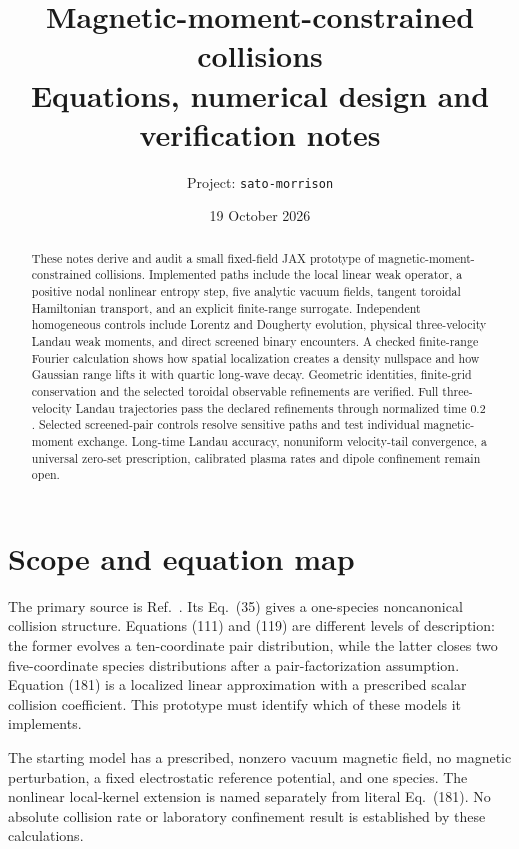 \documentclass[11pt,letterpaper]{article}
\title{Magnetic-moment-constrained collisions\\\large Equations, numerical design and verification notes}
\author{Project: \texttt{sato-morrison}}
\date{19 October 2026}
\begin{document}
\maketitle
\begin{abstract}
These notes derive and audit a small fixed-field JAX prototype of
magnetic-moment-constrained collisions. Implemented paths include the local
linear weak operator, a positive nodal nonlinear entropy step, five analytic
vacuum fields, tangent toroidal Hamiltonian transport, and an explicit
finite-range surrogate. Independent homogeneous controls include Lorentz and
Dougherty evolution, physical three-velocity Landau weak moments, and direct
screened binary encounters. A checked finite-range Fourier calculation shows
how spatial localization creates a density nullspace and how Gaussian range
lifts it with quartic long-wave decay. Geometric identities, finite-grid
conservation and the selected toroidal observable refinements are verified.
Full three-velocity Landau trajectories pass the declared refinements through
normalized time $0.2$. Selected screened-pair controls resolve sensitive
paths and test individual magnetic-moment exchange. Long-time Landau
accuracy, nonuniform velocity-tail convergence, a universal zero-set
prescription, calibrated plasma rates and dipole confinement remain open.
\end{abstract}

\section{Scope and equation map}

The primary source is Ref.~\cite{SM25}. Its Eq.~(35) gives a one-species
noncanonical collision structure. Equations (111) and (119) are different levels
of description: the former evolves a ten-coordinate pair distribution, while the
latter closes two five-coordinate species distributions after a pair-factorization
assumption. Equation (181) is a localized linear approximation with a prescribed
scalar collision coefficient. This prototype must identify which of these models
it implements.

The starting model has a prescribed, nonzero vacuum magnetic field, no magnetic
perturbation, a fixed electrostatic reference potential, and one species. The
nonlinear local-kernel extension is named separately from literal Eq.~(181).
No absolute collision rate or laboratory confinement result is established by
these calculations.
\end{document}
